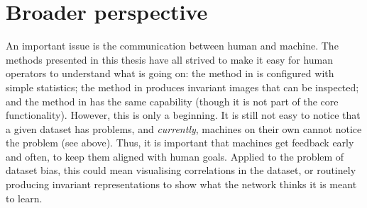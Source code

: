 \section{Broader perspective}\label{sec:broader-perspective}
%
An important issue is the communication between human and machine. The methods presented in this
thesis have all strived to make it easy for human operators to understand what is going on: the
method in  is configured with simple statistics; the method in
 produces invariant images that can be inspected; and the method in
 has the same capability (though it is not part of the core functionality).
However, this is only a beginning. It is still not easy to notice that a given dataset has
problems, and \emph{currently}, machines on their own cannot notice the problem (see above). Thus,
it is important that machines get feedback early and often, to keep them aligned with human goals.
Applied to the problem of dataset bias, this could mean visualising correlations in the dataset, or
routinely producing invariant representations to show what the network thinks it is meant to learn.

